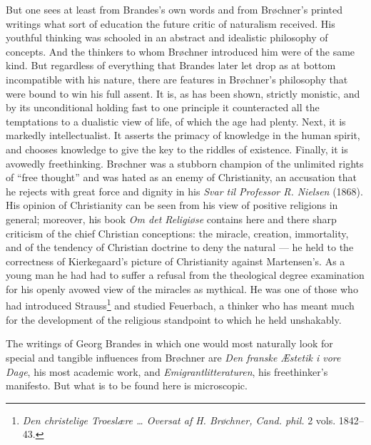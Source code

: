 \documentclass[12pt,a4paper,openany]{book}
\newcommand{\opage}[1]{\marginnote{\footnotesize\textit{[#1]}}}
\begin{document}
But one sees at least from Brandes's own words and from Brøchner's printed writings what sort of education the
future critic of naturalism received. His youthful thinking was schooled in an abstract and idealistic philosophy
of concepts. And the thinkers to whom Brøchner introduced him were of the same
\opage{157}\setcounter{footnote}{0}%
kind. But regardless of everything that Brandes later let drop as at bottom incompatible with his nature, there
are features in Brøchner's philosophy that were bound to win his full assent. It is, as has been shown, strictly
monistic, and by its unconditional holding fast to one principle it counteracted all the temptations to a
dualistic view of life, of which the age had plenty. Next, it is markedly intellectualist. It asserts the primacy
of knowledge in the human spirit, and chooses knowledge to give the key to the riddles of existence. Finally, it is
avowedly freethinking. Brøchner was a stubborn champion of the unlimited rights of ``free thought'' and was hated as
an enemy of Christianity, an accusation that he rejects with great force and dignity in his \textit{Svar til
Professor R. Nielsen} (1868). His opinion of Christianity can be seen from his view of positive religions in
general; moreover, his book \textit{Om det Religiøse} contains here and there sharp criticism of the chief Christian
conceptions: the miracle, creation, immortality, and of the tendency of Christian doctrine to deny the natural ---
he held to the correctness of Kierkegaard's picture of Christianity against Martensen's. As a young man he had had
to suffer a refusal from the theological degree examination for his openly avowed view of the miracles as mythical.
He was one of those who had introduced Strauss\footnote{\textit{Den christelige Troeslære \dots{} Oversat af
H. Brøchner, Cand. phil.} 2 vols. 1842--43.} and studied Feuerbach, a thinker who has meant much for the
development of the religious standpoint to which he held unshakably.

The writings of Georg Brandes in which one would most naturally look for special and tangible influences from
Brøchner are \textit{Den franske Æstetik i vore Dage}, his most academic work, and \textit{Emigrantlitteraturen},
his freethinker's manifesto. But what is to be found here is microscopic.
\end{document}
